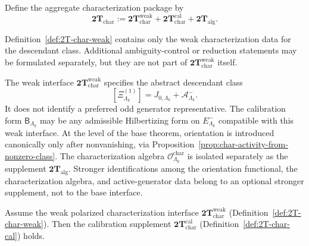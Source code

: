 \begin{definition}
\label{def:2T-char}
Define the aggregate characterization package by
\[
\mathbf{2T}_{\mathrm{char}}
:=
\mathbf{2T}_{\mathrm{char}}^{\mathrm{weak}}
+ \mathbf{2T}_{\mathrm{char}}^{\mathrm{cal}}
+ \mathbf{2T}_{\mathrm{alg}}.
\]
\end{definition}

\begin{remark}
\label{rem:char-cosmo-supplement-separate}
Definition~\ref{def:2T-char-weak} contains only the weak characterization data
for the descendant class. Additional ambiguity-control or reduction statements may be
formulated separately, but they are not part of
\(\mathbf{2T}_{\mathrm{char}}^{\mathrm{weak}}\) itself.
\end{remark}

\begin{remark}
\label{rem:char-cosmo-realization}
The weak interface \(\mathbf{2T}_{\mathrm{char}}^{\mathrm{weak}}\) specifies the
abstract descendant class
\[
[\Xi^{(1)}_{\Lambda_k}]
=
J_{0,\Lambda_k}+\mathcal A^-_{\Lambda_k}.
\]
It does not identify a preferred odd generator representative. The calibration
form \(\mathsf B_{\Lambda_k}\) may be any admissible Hilbertizing form on
\(E^-_{\Lambda_k}\) compatible with this weak interface. At the level of the
base theorem,
orientation is introduced canonically only after nonvanishing, via
Proposition~\ref{prop:char-activity-from-nonzero-class}.
The characterization algebra \(\mathcal O^{\mathrm{char}}_{\Lambda_k}\) is isolated
separately as the supplement \(\mathbf{2T}_{\mathrm{alg}}\).
Stronger identifications among the orientation functional, the characterization
algebra, and active-generator data belong to an optional stronger supplement, not to
the base interface.
\end{remark}

\begin{theorem}
\label{thm:char-weak-to-cal}
Assume the weak polarized characterization interface
\(\mathbf{2T}_{\mathrm{char}}^{\mathrm{weak}}\)
\textnormal{(Definition~\ref{def:2T-char-weak})}. Then the calibration supplement
\(\mathbf{2T}_{\mathrm{char}}^{\mathrm{cal}}\)
\textnormal{(Definition~\ref{def:2T-char-cal})} holds.
\end{theorem}

